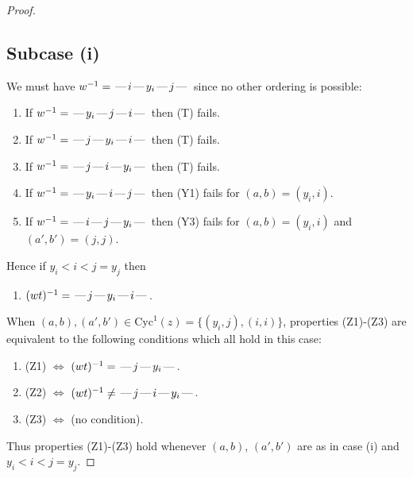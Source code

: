 \documentclass[10pt]{article}
\theoremstyle{definition}
\theoremstyle{definition}
\def\dash{\text{\hspace{0.5mm}---\hspace{0.5mm}}}
\def\Cyc{\mathrm{Cyc}}
\begin{document}
\begin{proof}
\subsection{Subcase (i)}
We must have $w^{-1} = \dash i\dash y_i\dash j\dash $
since no other ordering is possible:
\begin{enumerate}
\item If $w^{-1} = \dash y_i\dash j\dash i\dash $ then (T) fails.
\item If $w^{-1} = \dash j\dash y_i\dash i\dash $ then (T) fails.
\item If $w^{-1} = \dash j\dash i\dash y_i\dash $ then (T) fails.
\item If $w^{-1} = \dash y_i\dash i\dash j\dash $ then (Y1) fails for $(a,b)=(y_i,i)$.
\item If $w^{-1} = \dash i\dash j\dash y_i\dash $ then (Y3) fails for $(a,b)=(y_i,i)$ and $(a',b')=(j,j)$.
\end{enumerate}
Hence if $y_i < i < j = y_j$ then \begin{enumerate}\item[] $(wt)^{-1} = \dash j\dash y_i\dash i\dash $. \end{enumerate}
When $(a,b),(a',b')\in\Cyc^1(z)= \{(y_i,j),(i,i)\}$,
properties (Z1)-(Z3) are equivalent to the following conditions which all hold in this case:
\begin{enumerate}
\item[](Z1) $\Leftrightarrow$ $(wt)^{-1} = \dash j \dash y_i \dash$.
\item[](Z2) $\Leftrightarrow$ $(wt)^{-1} \neq \dash j \dash i \dash y_i \dash$.
\item[](Z3) $\Leftrightarrow$ (no condition).
\end{enumerate}
Thus properties (Z1)-(Z3) hold whenever $(a,b)$, $(a',b')$ are as in case (i) and $y_i < i < j = y_j$.

\end{proof}
\end{document}
